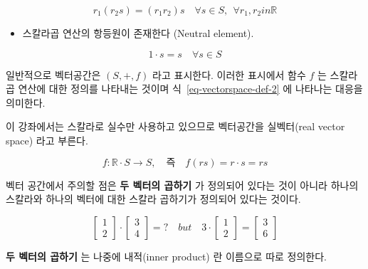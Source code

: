 \documentclass[
  11pt,
  a4paper,
  oneside]{scrbook}
\providecommand{\tightlist}{%
  \setlength{\itemsep}{0pt}\setlength{\parskip}{0pt}}\usepackage{longtable,booktabs,array}
\newcommand{\RR}{\mathbb{R}}
\theoremstyle{definition}
\theoremstyle{plain}
\theoremstyle{definition}
\theoremstyle{definition}
\theoremstyle{remark}
\begin{document}
\[  r_1(r_2s) = (r_1 r_2) s  \quad \forall s \in S, ~~ \forall r_1,r_2 in \RR \]

\begin{itemize}
\tightlist
\item
  스칼라곱 연산의 항등원이 존재한다 (Neutral element).
\end{itemize}

\[  1 \cdot s  = s \quad \forall s \in S \]

일반적으로 벡터공간은 \((S,+,f)\) 라고 표시한다. 이러한 표시에서 함수
\(f\) 는 스칼라곱 연산에 대한 정의를 나타내는 것이며
식~\ref{eq-vectorspace-def-2} 에 나타나는 대응을 의미한다.

이 강좌에서는 스칼라로 실수만 사용하고 있으므로 벡터공간을 실벡터(real
vector space) 라고 부른다.

\[ f : \RR \cdot S \rightarrow  S, \quad \text{즉} \quad f(rs) = r \cdot s =rs \]

\begin{tcolorbox}[enhanced jigsaw, colback=white, title=\textcolor{quarto-callout-caution-color}{\faFire}\hspace{0.5em}{주의}, colbacktitle=quarto-callout-caution-color!10!white, toprule=.15mm, breakable, bottomtitle=1mm, left=2mm, colframe=quarto-callout-caution-color-frame, leftrule=.75mm, coltitle=black, toptitle=1mm, titlerule=0mm, arc=.35mm, opacityback=0, opacitybacktitle=0.6, rightrule=.15mm, bottomrule=.15mm]

벡터 공간에서 주의할 점은 \textbf{두 벡터의 곱하기} 가 정의되어 있다는
것이 아니라 하나의 스칼라와 하나의 벡터에 대한 스칼라 곱하기가 정의되어
있다는 것이다.

\[
\begin{bmatrix}
1 \\
2 
\end{bmatrix}
\cdot
\begin{bmatrix}
3 \\
4 
\end{bmatrix}
=?
\quad {but} \quad
3 \cdot
\begin{bmatrix}
1 \\
2 
\end{bmatrix}
= 
\begin{bmatrix}
3 \\
6
\end{bmatrix}
\]

\textbf{두 벡터의 곱하기} 는 나중에 내적(inner product) 란 이름으로 따로
정의한다.

\end{tcolorbox}
\end{document}
